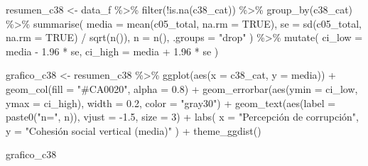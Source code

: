 \documentclass[
  spanish,
  a4paper,
  oneside]{scrbook}
\newenvironment{Shaded}{\begin{snugshade}}{\end{snugshade}}
\newcommand{\AttributeTok}[1]{\textcolor[rgb]{0.40,0.45,0.13}{#1}}
\newcommand{\ConstantTok}[1]{\textcolor[rgb]{0.56,0.35,0.01}{#1}}
\newcommand{\DecValTok}[1]{\textcolor[rgb]{0.68,0.00,0.00}{#1}}
\newcommand{\FloatTok}[1]{\textcolor[rgb]{0.68,0.00,0.00}{#1}}
\newcommand{\FunctionTok}[1]{\textcolor[rgb]{0.28,0.35,0.67}{#1}}
\newcommand{\NormalTok}[1]{\textcolor[rgb]{0.00,0.23,0.31}{#1}}
\newcommand{\OtherTok}[1]{\textcolor[rgb]{0.00,0.23,0.31}{#1}}
\newcommand{\SpecialCharTok}[1]{\textcolor[rgb]{0.37,0.37,0.37}{#1}}
\newcommand{\StringTok}[1]{\textcolor[rgb]{0.13,0.47,0.30}{#1}}
\begin{document}
\begin{Shaded}
\begin{Highlighting}[]
\NormalTok{resumen\_c38 }\OtherTok{\textless{}{-}}\NormalTok{ data\_f }\SpecialCharTok{\%\textgreater{}\%}
  \FunctionTok{filter}\NormalTok{(}\SpecialCharTok{!}\FunctionTok{is.na}\NormalTok{(c38\_cat)) }\SpecialCharTok{\%\textgreater{}\%}
  \FunctionTok{group\_by}\NormalTok{(c38\_cat) }\SpecialCharTok{\%\textgreater{}\%}
  \FunctionTok{summarise}\NormalTok{(}
    \AttributeTok{media   =} \FunctionTok{mean}\NormalTok{(c05\_total, }\AttributeTok{na.rm =} \ConstantTok{TRUE}\NormalTok{),}
    \AttributeTok{se      =} \FunctionTok{sd}\NormalTok{(c05\_total, }\AttributeTok{na.rm =} \ConstantTok{TRUE}\NormalTok{) }\SpecialCharTok{/} \FunctionTok{sqrt}\NormalTok{(}\FunctionTok{n}\NormalTok{()),}
    \AttributeTok{n       =} \FunctionTok{n}\NormalTok{(),}
    \AttributeTok{.groups =} \StringTok{"drop"}
\NormalTok{  ) }\SpecialCharTok{\%\textgreater{}\%}
  \FunctionTok{mutate}\NormalTok{(}
    \AttributeTok{ci\_low  =}\NormalTok{ media }\SpecialCharTok{{-}} \FloatTok{1.96} \SpecialCharTok{*}\NormalTok{ se,}
    \AttributeTok{ci\_high =}\NormalTok{ media }\SpecialCharTok{+} \FloatTok{1.96} \SpecialCharTok{*}\NormalTok{ se}
\NormalTok{  )}

\NormalTok{grafico\_c38 }\OtherTok{\textless{}{-}}\NormalTok{ resumen\_c38 }\SpecialCharTok{\%\textgreater{}\%}
  \FunctionTok{ggplot}\NormalTok{(}\FunctionTok{aes}\NormalTok{(}\AttributeTok{x =}\NormalTok{ c38\_cat, }\AttributeTok{y =}\NormalTok{ media)) }\SpecialCharTok{+}
  \FunctionTok{geom\_col}\NormalTok{(}\AttributeTok{fill =} \StringTok{"\#CA0020"}\NormalTok{, }\AttributeTok{alpha =} \FloatTok{0.8}\NormalTok{) }\SpecialCharTok{+}
  \FunctionTok{geom\_errorbar}\NormalTok{(}\FunctionTok{aes}\NormalTok{(}\AttributeTok{ymin =}\NormalTok{ ci\_low, }\AttributeTok{ymax =}\NormalTok{ ci\_high),}
                \AttributeTok{width =} \FloatTok{0.2}\NormalTok{, }\AttributeTok{color =} \StringTok{"gray30"}\NormalTok{) }\SpecialCharTok{+}
  \FunctionTok{geom\_text}\NormalTok{(}\FunctionTok{aes}\NormalTok{(}\AttributeTok{label =} \FunctionTok{paste0}\NormalTok{(}\StringTok{"n="}\NormalTok{, n)), }\AttributeTok{vjust =} \SpecialCharTok{{-}}\FloatTok{1.5}\NormalTok{, }\AttributeTok{size =} \DecValTok{3}\NormalTok{) }\SpecialCharTok{+}
  \FunctionTok{labs}\NormalTok{(}
    \AttributeTok{x =} \StringTok{"Percepción de corrupción"}\NormalTok{,}
    \AttributeTok{y =} \StringTok{"Cohesión social vertical (media)"}
\NormalTok{  ) }\SpecialCharTok{+}
  \FunctionTok{theme\_ggdist}\NormalTok{()}

\NormalTok{grafico\_c38}
\end{Highlighting}
\end{Shaded}
\end{document}
